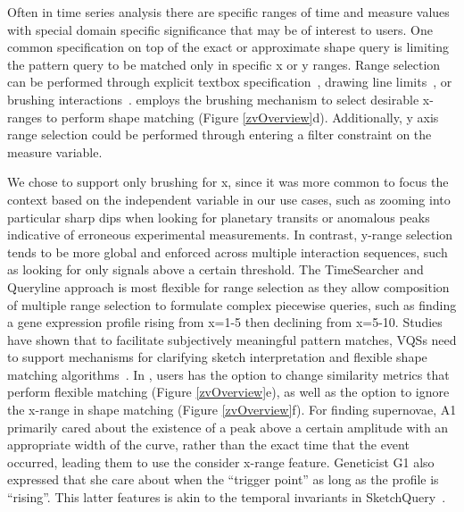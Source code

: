  Often in time series analysis there are specific ranges of time and measure values with special domain specific significance that may be of interest to users. One common specification on top of the exact or approximate shape query is limiting the pattern query to be matched only in specific x or y ranges. Range selection can be performed through explicit textbox specification~\cite{wattenberg2001sketching,Mannino2018}, drawing line limits~\cite{ryall2005querylines}, or brushing interactions~\cite{Hochheiser2001}. \zv employs the brushing mechanism to select desirable x-ranges to perform shape matching (Figure \ref{zvOverview}d). Additionally, y axis range selection could be performed through entering a filter constraint on the measure variable.
\par We chose to support only brushing for x, since it was more common to focus the context based on the independent variable in our use cases, such as zooming into particular sharp dips when looking for planetary transits or anomalous peaks indicative of erroneous experimental measurements. In contrast, y-range selection tends to be more global and enforced across multiple interaction sequences, such as looking for only signals above a certain threshold. The TimeSearcher and Queryline approach is most flexible for range selection as they allow composition of multiple range selection to formulate complex piecewise queries, such as finding a gene expression profile rising from x=1-5 then declining from x=5-10.
 Studies have shown that to facilitate subjectively meaningful pattern matches, VQSs need to support mechanisms for clarifying sketch interpretation and flexible shape matching algorithms~\cite{correll2016semantics,Mannino2018,Eichmann2015}. In \zv, users has the option to change similarity metrics that perform flexible matching (Figure \ref{zvOverview}e), as well as the option to ignore the x-range in shape matching (Figure \ref{zvOverview}f). For finding supernovae, A1 primarily cared about the existence of a peak above a certain amplitude with an appropriate width of the curve, rather than the exact time that the event occurred, leading them to use the consider x-range feature. Geneticist G1 also expressed that she care about when the ``trigger point'' as long as the profile is ``rising''. This latter features is akin to the temporal invariants in SketchQuery~\cite{correll2016semantics}.

